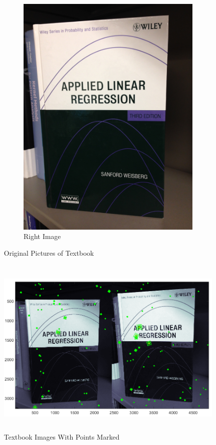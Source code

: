 \documentclass[11pt,psfig]{article}
\begin{document}
\begin{figure}
\begin{subfigure}[b]{0.4\textwidth}
                \includegraphics[width=\textwidth]{book2.jpg}
                \caption{Right Image}
        \end{subfigure}
        \caption{Original Pictures of Textbook}
        \label{bk1}
\end{figure}

\begin{figure}[H]
\centering
\includegraphics[height=3.5in]{book_pointsWoMatching.png}
\caption{Textbook Images With Points Marked}
\label{bk2}
\end{figure}
\end{document}
